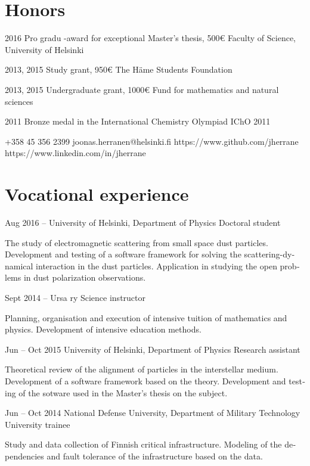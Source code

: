 \documentclass{tccv}
\begin{document}
\begin{otherlanguage}{english}
\section{Honors}
\begin{yearlist}
	\item{2016}
	{Pro gradu -award for exceptional Master's thesis, 500€}
	{Faculty of Science, University of Helsinki}
	\item{2013, 2015}
	{Study grant, 950€}
	{The Häme Students Foundation}	
	\item{2013, 2015}
	{Undergraduate grant, 1000€}
	{Fund for mathematics and natural sciences}	
	\item{2011}
	{Bronze medal in the International Chemistry Olympiad}
	{IChO 2011}	
\end{yearlist}

{+358 45 356 2399}
{joonas.herranen@helsinki.fi}
{https://www.github.com/jherrane}
{https://www.linkedin.com/in/jherrane}

\section{Vocational experience}
\begin{eventlist}	
	\item{Aug 2016 -- }
	{University of Helsinki, Department of Physics}
	{Doctoral student}
	
	The study of electromagnetic scattering from small space dust particles. Development and testing of a software framework for solving the scattering-dynamical interaction in the dust particles. Application in studying the open problems in dust polarization observations.
	
	\item{Sept 2014 --}
	{Ursa ry}
	{Science instructor}
	
	Planning, organisation and execution of intensive tuition of mathematics and physics. Development of intensive education methods.
	
	\item{Jun -- Oct 2015}
	{University of Helsinki, Department of Physics}
	{Research assistant}
	
	Theoretical review of the alignment of particles in the interstellar medium. Development of a software framework based on the theory. Development and testing of the sotware used in the Master's thesis on the subject.
	
	\item{Jun -- Oct 2014}
	{National Defense University, \hspace*{2in} \linebreak
	Department of Military Technology}
	{University trainee}
	
	Study and data collection of Finnish critical infrastructure. Modeling of the dependencies and fault tolerance of the infrastructure based on the data.
	
\end{eventlist}
\end{otherlanguage}
\end{document}
